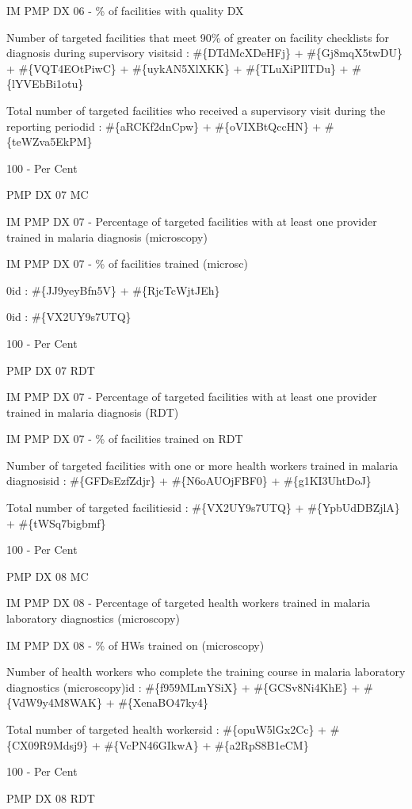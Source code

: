 \documentclass[]{book}
\begin{document}
IM PMP DX 06 - \% of facilities with quality DX

Number of targeted facilities that meet 90\% of greater on facility checklists for diagnosis during supervisory visitsid : \#\{DTdMcXDeHFj\} + \#\{Gj8mqX5twDU\} + \#\{VQT4EOtPiwC\} + \#\{uykAN5XlXKK\} + \#\{TLuXiPIlTDu\} + \#\{lYVEbBi1otu\}

Total number of targeted facilities who received a supervisory visit during the reporting periodid : \#\{aRCKf2dnCpw\} + \#\{oVIXBtQccHN\} + \#\{teWZva5EkPM\}

100 - Per Cent

PMP DX 07 MC

IM PMP DX 07 - Percentage of targeted facilities with at least one provider trained in malaria diagnosis (microscopy)

IM PMP DX 07 - \% of facilities trained (microsc)

0id : \#\{JJ9yeyBfn5V\} + \#\{RjcTcWjtJEh\}

0id : \#\{VX2UY9s7UTQ\}

100 - Per Cent

PMP DX 07 RDT

IM PMP DX 07 - Percentage of targeted facilities with at least one provider trained in malaria diagnosis (RDT)

IM PMP DX 07 - \% of facilities trained on RDT

Number of targeted facilities with one or more health workers trained in malaria diagnosisid : \#\{GFDsEzfZdjr\} + \#\{N6oAUOjFBF0\} + \#\{g1KI3UhtDoJ\}

Total number of targeted facilitiesid : \#\{VX2UY9s7UTQ\} + \#\{YpbUdDBZjlA\} + \#\{tWSq7bigbmf\}

100 - Per Cent

PMP DX 08 MC

IM PMP DX 08 - Percentage of targeted health workers trained in malaria laboratory diagnostics (microscopy)

IM PMP DX 08 - \% of HWs trained on (microscopy)

Number of health workers who complete the training course in malaria laboratory diagnostics (microscopy)id : \#\{f959MLmYSiX\} + \#\{GCSv8Ni4KhE\} + \#\{VdW9y4M8WAK\} + \#\{XenaBO47ky4\}

Total number of targeted health workersid : \#\{opuW5lGx2Cc\} + \#\{CX09R9Mdsj9\} + \#\{VcPN46GIkwA\} + \#\{a2RpS8B1eCM\}

100 - Per Cent

PMP DX 08 RDT
\end{document}
